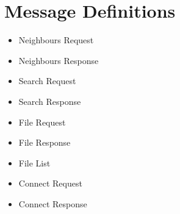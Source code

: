 \section{Message Definitions}

\begin{itemize}
  \item{Neighbours Request}
  \item{Neighbours Response}
  \item{Search Request}
  \item{Search Response}
  \item{File Request}
  \item{File Response}
  \item{File List}
  \item{Connect Request}
  \item{Connect Response}
\end{itemize}


